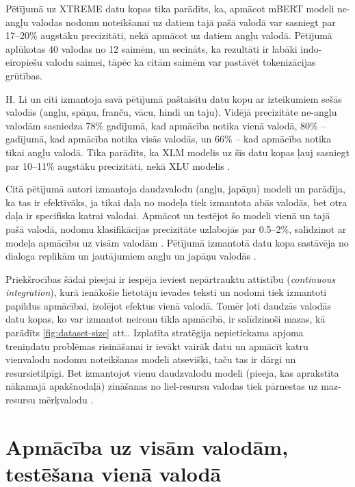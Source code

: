 
Pētījumā uz XTREME datu kopas \cite{hu2020} tika parādīts, ka, apmācot mBERT modeli \cite{devlin2019} ne-angļu valodas nodomu noteikšanai uz datiem tajā pašā valodā var sasniegt par 17--20\% augstāku precizitāti, nekā apmācot uz datiem angļu valodā. Pētījumā aplūkotas 40 valodas no 12 saimēm, un secināts, ka rezultāti ir labāki indo-eiropiešu valodu saimei, tāpēc ka citām saimēm var pastāvēt tokenizācijas grūtības.

H. Li un citi \cite{li2021} izmantoja savā pētījumā paštaisītu datu kopu ar izteikumiem sešās valodās (angļu, spāņu, franču, vācu, hindi un taju). Vidējā precizitāte ne-angļu valodām sasniedza 78\% gadījumā, kad apmācība notika vienā valodā, 80\% -- gadījumā, kad apmācība notika visās valodās, un 66\% -- kad apmācība notika tikai angļu valodā. Tika parādīts, ka XLM modelis \cite{conneau2020} uz šīs datu kopas ļauj sasniegt par 10--11\% augstāku precizitāti, nekā XLU modelis \cite{schuster2019}.

Citā pētījumā autori izmantoja daudzvalodu (angļu, japāņu) modeli un parādīja, ka tas ir efektīvāks, ja tikai daļa no modeļa tiek izmantota abās valodās, bet otra daļa ir specifiska katrai valodai. Apmācot un testējot šo modeli vienā un tajā pašā valodā, nodomu klasifikācijas precizitāte uzlabojās par 0.5--2\%, salīdzinot ar modeļa apmācību uz visām valodām \cite{masumura2018}. Pētījumā izmantotā datu kopa sastāvēja no dialoga replikām un jautājumiem angļu un japāņu valodās \cite{sekine2004}.

Priekšrocības šādai pieejai ir iespēja ieviest nepārtrauktu attīstību (\textit{continuous integration}), kurā ienākošie lietotāju ievades teksti un nodomi tiek izmantoti papildus apmācībai, izolējot efektus vienā valodā. %
Tomēr ļoti daudzās valodās datu kopas, ko var izmantot neironu tīkla apmācībā, ir salīdzinoši mazas, kā parādīts \ref{fig:dataset-size} att..
Izplatīta stratēģija nepietiekama apjoma treniņdatu problēmas risināšanai ir ievākt vairāk datu un apmācīt katru vienvalodu nodomu noteikšanas modeli atsevišķi, taču tas ir dārgi un resursietilpīgi. Bet izmantojot vienu daudzvalodu modeli (pieeja, kas aprakstīta nākamajā apakšnodaļā) zināšanas no liel-resursu valodas tiek pārnestas uz maz-resursu mērķvalodu \cite{liu2020}.

\section{Apmācība uz visām valodām, testēšana vienā valodā}

